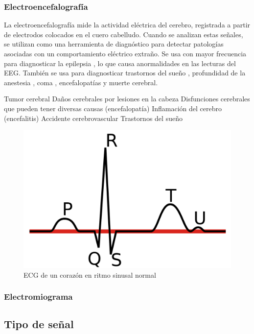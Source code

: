 \subsubsection{Electroencefalografía}

La electroencefalografía mide la actividad eléctrica del cerebro, registrada a partir de electrodos colocados en el cuero cabelludo. Cuando se analizan estas señales, se utilizan como una herramienta de diagnóstico para detectar patologías asociadas con un comportamiento eléctrico extraño.  Se usa con mayor frecuencia para diagnosticar la epilepsia , lo que causa anormalidades en las lecturas del EEG. También se usa para diagnosticar trastornos del sueño , profundidad de la anestesia , coma , encefalopatías y muerte cerebral.

Tumor cerebral
Daños cerebrales por lesiones en la cabeza
Disfunciones cerebrales que pueden tener diversas causas (encefalopatía)
Inflamación del cerebro (encefalitis)
Accidente cerebrovascular
Trastornos del sueño

\begin{figure}[H]
	\center
	\includegraphics[scale=0.1]{imagenes/EstadodelArte/ECG.png}
	\caption{ECG de un corazón en ritmo sinusal normal}
	\label{fig:ECG}
\end{figure}
 

\subsubsection{Electromiograma}



\subsection{Tipo de señal }

